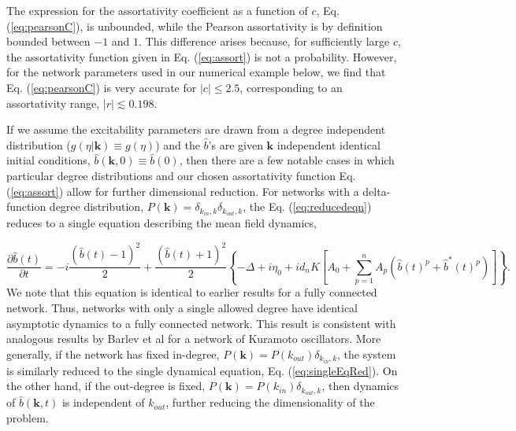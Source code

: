 \documentclass[%
 aip,
 sd,%
 amsmath,amssymb,
 reprint,%
]{revtex4-1}
\begin{document}
The expression for the assortativity coefficient as a function of $c$, Eq. (\ref{eq:pearsonC}), is unbounded, while the Pearson assortativity is by definition bounded between $-1$ and $1$. This difference arises because, for sufficiently large $c$, the assortativity function given in Eq. (\ref{eq:assort}) is not a probability. However, for the network parameters used in our numerical example below, we find that Eq. (\ref{eq:pearsonC}) is very accurate for $|c| \leq 2.5$, corresponding to an assortativity range, $|r| \lesssim 0.198 $.


If we assume the excitability parameters are drawn from a degree independent distribution ($g(\eta |\mathbf{k}) \equiv g(\eta)$) and the $\hat b$'s are given $\mathbf{k}$ independent identical initial conditions, $\hat b(\mathbf{k}, 0) \equiv \hat b(0)$, then there are a few notable cases in which particular degree distributions and our chosen assortativity function Eq. (\ref{eq:assort}) allow for further dimensional reduction. For networks with a delta-function degree distribution, $P(\mathbf{k}) = \delta_{k_{in}, k} \delta_{k_{out}, k}$, the Eq. (\ref{eq:reducedeqn}) reduces to a single equation describing the mean field dynamics, 

\begin{dmath} \label{eq:singleEqRed}
\frac{\partial{\hat b(t)}}{\partial t} = -i \frac{(\hat b(t)-1)^2}{2} + \frac{ (\hat b(t) + 1)^2}{2} \left\{-\Delta + i \eta_0 + i d_n K \left[ A_0 + \sum_{p=1}^n A_p (\hat b(t)^p + \hat b^*(t)^p) \right]\right\}.
\end{dmath}
We note that this equation is identical to earlier results for a fully connected network\cite{luke2013complete}. Thus, networks with only a single allowed degree have identical asymptotic dynamics to a fully connected network. This result is consistent with analogous results by Barlev et al\cite{barlev2011dynamics} for a network of Kuramoto oscillators. More generally, if the network has fixed in-degree, $P(\mathbf{k}) = P(k_{out}) \delta_{k_{in}, k}$, the system is similarly reduced to the single dynamical equation, Eq. (\ref{eq:singleEqRed}). On the other hand, if the out-degree is fixed,  $P(\mathbf{k}) = P(k_{in}) \delta_{k_{out}, k}$, then dynamics of $\hat b(\mathbf{k},t)$ is independent of $k_{out}$, further reducing the dimensionality of the problem.
\end{document}
